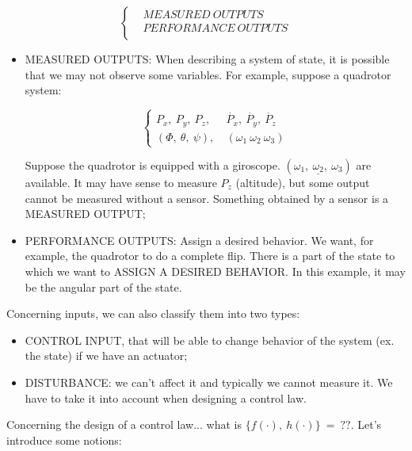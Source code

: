 \begin{equation}
\left\{
\begin{aligned}
& MEASURED\ OUTPUTS \\
& PERFORMANCE\ OUTPUTS \\
\end{aligned} 
\right.
\end{equation}

\begin{itemize}

\item MEASURED OUTPUTS: When describing a system of state, it is possible that we may not observe some variables. For example, suppose a quadrotor system:

\begin{equation}
\left\{
\begin{aligned}
P_x,\ P_y,\ P_z,&\ \dot{P_x},\ \dot{P_y},\ \dot{P_z}\\
(\Phi,\ \theta,\ \psi),&\ (\omega_1\ \omega_2\ \omega_3)
\end{aligned} 
\right.
\end{equation}

Suppose the quadrotor is equipped with a giroscope. $(\underline{\omega_1,\ \omega_2,\ \omega_3})$ are available. It may have sense to measure $P_z$ (altitude), but some output cannot be measured without a sensor. Something obtained by a sensor is a  MEASURED OUTPUT;

\item PERFORMANCE OUTPUTS: Assign a desired behavior. We want, for example, the quadrotor to do a complete flip. There is a part of the state to which we want to ASSIGN A DESIRED BEHAVIOR. In this example, it may be the angular part of the state.

\end{itemize}

Concerning inputs, we can also classify them into two types:

\begin{itemize}

\item CONTROL INPUT, that will be able to change behavior of the system (ex. the state) if we have an actuator;
\item DISTURBANCE: we can't affect it and typically we cannot measure it. We have to take it into account when designing a control law.

\end{itemize}


Concerning the design of a control law... what is $\{f(\mathord{\cdot}),\ h(\mathord{\cdot})\}\ =\ ??$. Let's introduce some notions:

